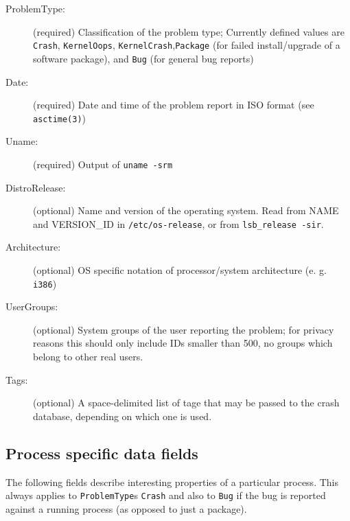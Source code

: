 \documentclass[DIV12,halfparskip]{scrartcl}
\begin{document}
\begin{description}
    \item [ProblemType:] (required) Classification of the problem type;
    Currently defined values are \verb!Crash!, \verb!KernelOops!,
    \verb!KernelCrash!,\verb!Package! (for failed install/upgrade of a software
    package), and \verb!Bug! (for general bug reports)

    \item [Date:] (required) Date and time of the problem report in ISO format
    (see \verb!asctime(3)!)

    \item [Uname:] (required) Output of \verb!uname -srm!

    \item [DistroRelease:] (optional) Name and version of the operating system.
      Read from NAME and VERSION\_ID in \verb!/etc/os-release!, or from
      \verb!lsb_release -sir!.

    \item [Architecture:] (optional) OS specific notation of
    processor/system architecture (e. g. \verb!i386!)

    \item [UserGroups:] (optional) System groups of the user reporting the
    problem; for privacy reasons this should only include IDs smaller than 500,
    no groups which belong to other real users.

    \item [Tags:] (optional) A space-delimited list of tage that may be passed
    to the crash database, depending on which one is used.
\end{description}

\subsection{Process specific data fields}

The following fields describe interesting properties of a particular process.
This always applies to \verb!ProblemType!s \verb!Crash! and also to \verb!Bug!
if the bug is reported against a running process (as opposed to just a
package).
\end{document}

